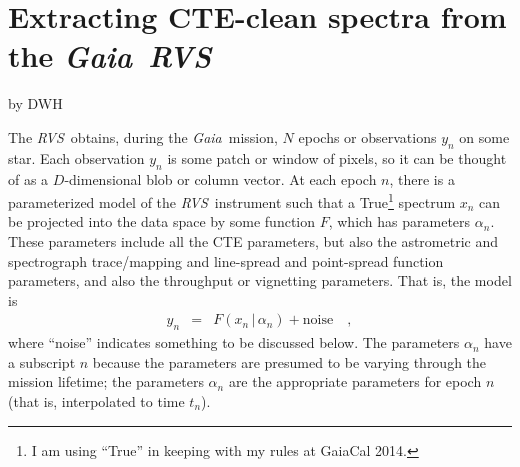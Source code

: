 \documentclass[11pt]{article}
\newcommand{\given}{\,|\,}
\newcommand{\instrument}[1]{\textsl{#1}}
\newcommand{\Gaia}{\instrument{Gaia}}
\newcommand{\RVS}{\instrument{RVS}}
\begin{document}
\section*{Extracting CTE-clean spectra from the \Gaia\ \RVS}
\noindent
by DWH

\begin{abstract}

The \Gaia~\RVS\ data will suffer from observable distortions (CTE)
caused by radiation damage and the charge traps that are caused
thereby.
The \RVS\ team is creating empirical models of the time-dependent
distortions.
These models are computationally feasible to ``run forward''; indeed
parameter estimation (radial velocities, temperatures, and so on)
based on the \RVS\ will be based on a forward model of the data,
including the CTE.
Here we show that it is possible to extract CTE-undistorted spectra
from either single epochs or else multiple epochs of \RVS\ data using
one of these CTE models.
There is no need to ``undistort'' or ``correct'' the data.
Inasmuch as these extracted spectra and their uncertainty tensors will
be close to sufficient statistics for the raw data, they could be used
for stellar parameter estimation.
The methods presented here presume that it is possible to write down a
likelihood---a probability for the data given the True spectrum---if
this isn't possible, then more extreme generative-model-based methods
can be used.
\end{abstract}

The \RVS\ obtains, during the \Gaia\ mission, $N$ epochs or
observations $y_n$ on some star.
Each observation $y_n$ is some patch or window of pixels, so it can be
thought of as a $D$-dimensional blob or column vector.
At each epoch $n$, there is a parameterized model of the
\RVS\ instrument such that a True\footnote{I am using ``True'' in
  keeping with my rules at GaiaCal 2014.} spectrum $x_n$ can be
projected into the data space by some function $F$, which has
parameters $\alpha_n$.
These parameters include all the CTE parameters, but also the
astrometric and spectrograph trace/mapping and line-spread and
point-spread function parameters, and also the throughput or vignetting parameters.
That is, the model is
\begin{eqnarray}
y_n &=& F(x_n\given \alpha_n) + \mbox{noise}
\quad,
\end{eqnarray}
where ``noise'' indicates something to be discussed below.
The parameters $\alpha_n$ have a subscript $n$ because the parameters
are presumed to be varying through the mission lifetime; the
parameters $\alpha_n$ are the appropriate parameters for epoch $n$
(that is, interpolated to time $t_n$).
\end{document}
